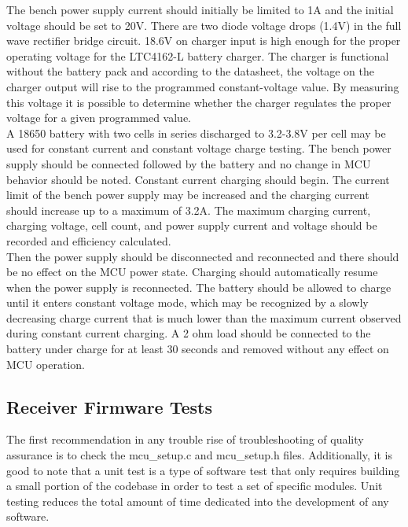 \documentclass[12pt]{article}
\begin{document}
\indent \indent
The bench power supply current should initially be limited to 1A and the initial voltage should be set to 20V.  There are two diode voltage drops (1.4V) in the full wave rectifier bridge circuit.  18.6V on charger input is high enough for the proper operating voltage for the LTC4162-L battery charger.  The charger is functional without the battery pack and according to the datasheet, the voltage on the charger output will rise to the programmed constant-voltage value. By measuring this voltage it is possible to determine whether the charger regulates the proper voltage for a given programmed value.
\hfill 
\pagebreak
\hfill \\

\indent
A 18650 battery with two cells in series discharged to 3.2-3.8V per cell may be used for constant current and constant voltage charge testing.  The bench power supply should be connected followed by the battery and no change in MCU behavior should be noted. Constant current charging should begin.  The current limit of the bench power supply may be increased and the charging current should increase up to a maximum of 3.2A. The maximum charging current, charging voltage, cell count, and power supply current and voltage should be recorded and efficiency calculated.\\

\indent Then the power supply should be disconnected and reconnected and there should be no effect on the MCU power state. Charging should automatically resume when the power supply is reconnected. The battery should be allowed to charge until it enters constant voltage mode, which may be recognized by a slowly decreasing charge current that is much lower than the maximum current observed during constant current charging.  A 2 ohm load should be connected to the battery under charge for at least 30 seconds and removed without any effect on MCU operation.

\subsection{Receiver Firmware Tests}

\indent \indent
The first recommendation in any trouble rise of troubleshooting of quality assurance is to check the mcu\_setup.c and mcu\_setup.h files.  Additionally, it is good to note that a unit test is a type of software test that only requires building a small portion of the codebase in order to test a set of specific modules.  Unit testing reduces the total amount of time dedicated into the development of any software.
\end{document}
